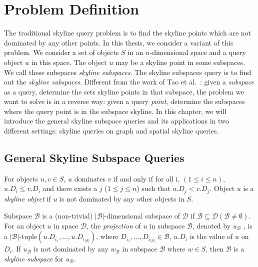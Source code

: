
%
%

\chapter{Problem Definition}
\label{ch:prob-def}

The traditional skyline query problem is to find the skyline points which are not dominated by any other points. In this thesis, we consider a variant of this problem. We consider a set of objects $S$ in an $n$-dimensional space and a query object $u$ in this space. The object $u$ may be a skyline point in some subspaces. We call these subspaces \emph{skyline subspaces}. The skyline subspaces query is to find out the \emph{skyline subspaces}. Different from the work of Tao et al.~\cite{tao2006subsky}: given a \emph{subspace} as a query, determine the sets skyline points in that subspace, the problem we want to solve is in a reverse way: given a query \emph{point}, determine the subspaces where the query point is in the subspace skyline. In this chapter, we will introduce the general skyline subspace queries and its applications in two different settings: skyline queries on graph and spatial skyline queries.

\section{General Skyline Subspace Queries}

\begin{definition}[Skyline]
For objects $u, v \in S$, $u$ dominates $v$ if and only if for all i, $(1 \leq i \leq n)$, $u.D_i \leq v.D_i$ and there exists a $j$ ($1 \leq j \leq n$) such that $u.D_j < v.D_j$. Object $u$ is a \emph{skyline object} if $u$ is not dominated by any other objects in $S$.
\end{definition}

\begin{definition}
Subspace $\mathcal{B}$ is a (non-trivial) $|\mathcal{B}|$-dimensional subspace of $\mathcal{D}$ 
if $\mathcal{B}\subseteq \mathcal{D} (\mathcal{B}\neq\emptyset)$.
For an object $u$ in space $\mathcal{D}$, 
the \emph{projection} of $u$ in subspace $\mathcal{B}$, denoted by $u_\mathcal{B}$
, is a $|\mathcal{B}|$-tuple$(u.D_{i_1},\dots,u.D_{i_{|\mathcal{B}|}})$,
where $D_{i_1},\dots,D_{i_{|\mathcal{B}|}} \in \mathcal{B}$, $u.D_i$ is the value of $u$ on $D_i$. If $u_\mathcal{B}$ is not dominated by any $w_\mathcal{B}$ in subspace $\mathcal{B}$ where $w \in S$, then $\mathcal{B}$ is a \emph{skyline subspace} for $u_\mathcal{B}$.
\end{definition}

